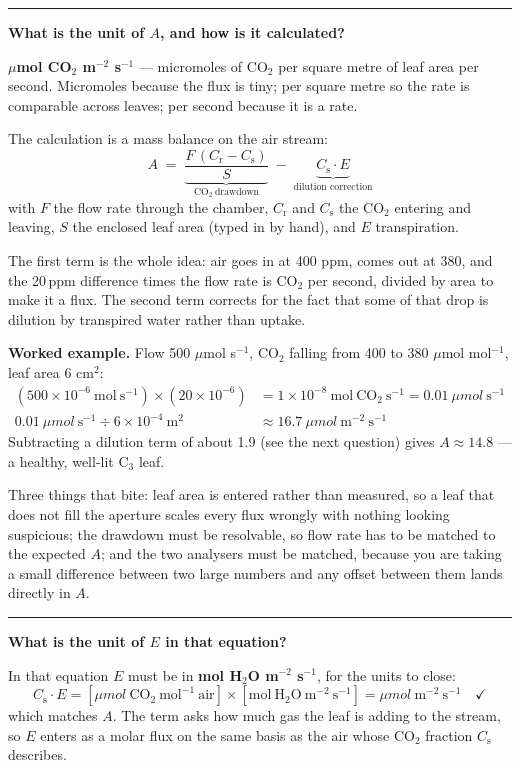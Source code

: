 \documentclass[11pt,letterpaper]{article}
\newcommand{\umol}{\ensuremath{\mu}mol}
\newcommand{\question}[1]{%
  \vspace{1.5em}%
  {\noindent\color{rulegray}\rule{\textwidth}{0.4pt}\par}%
  \vspace{0.7em}%
  {\noindent\color{accent}\bfseries #1\par}%
  \vspace{0.6em}%
}
\begin{document}
\question{What is the unit of $A$, and how is it calculated?}

\textbf{\umol{} CO$_2$ m$^{-2}$ s$^{-1}$} --- micromoles of CO$_2$ per square
metre of leaf area per second. Micromoles because the flux is tiny; per square
metre so the rate is comparable across leaves; per second because it is a rate.

The calculation is a mass balance on the air stream:
\[
A \;=\; \underbrace{\frac{F\,(C_{\mathrm{r}} - C_{\mathrm{s}})}{S}}_{\text{CO}_2\ \text{drawdown}}
   \;-\; \underbrace{C_{\mathrm{s}} \cdot E}_{\text{dilution correction}}
\]
with $F$ the flow rate through the chamber, $C_{\mathrm{r}}$ and
$C_{\mathrm{s}}$ the CO$_2$ entering and leaving, $S$ the enclosed leaf area
(typed in by hand), and $E$ transpiration.

The first term is the whole idea: air goes in at 400 ppm, comes out at 380, and
the 20\,ppm difference times the flow rate is CO$_2$ per second, divided by area
to make it a flux. The second term corrects for the fact that some of that drop
is dilution by transpired water rather than uptake.

\textbf{Worked example.} Flow 500 \umol{} s$^{-1}$, CO$_2$ falling from 400 to
380 \umol{} mol$^{-1}$, leaf area 6 cm$^2$:
\begin{align*}
(500 \times 10^{-6}\ \mathrm{mol\ s^{-1}}) \times (20 \times 10^{-6})
  &= 1 \times 10^{-8}\ \mathrm{mol\ CO_2\ s^{-1}} = 0.01\ \umol\ \mathrm{s^{-1}}\\
0.01\ \umol\ \mathrm{s^{-1}} \div 6 \times 10^{-4}\ \mathrm{m^2}
  &\approx 16.7\ \umol\ \mathrm{m^{-2}\ s^{-1}}
\end{align*}
Subtracting a dilution term of about 1.9 (see the next question) gives $A
\approx 14.8$ --- a healthy, well-lit C$_3$ leaf.

Three things that bite: leaf area is entered rather than measured, so a leaf
that does not fill the aperture scales every flux wrongly with nothing looking
suspicious; the drawdown must be resolvable, so flow rate has to be matched to
the expected $A$; and the two analysers must be matched, because you are taking
a small difference between two large numbers and any offset between them lands
directly in $A$.

\question{What is the unit of $E$ in that equation?}

In that equation $E$ must be in \textbf{mol H$_2$O m$^{-2}$ s$^{-1}$}, for the
units to close:
\[
C_{\mathrm{s}} \cdot E =
[\umol\ \mathrm{CO_2\ mol^{-1}\ air}] \times [\mathrm{mol\ H_2O\ m^{-2}\ s^{-1}}]
= \umol\ \mathrm{m^{-2}\ s^{-1}} \quad\checkmark
\]
which matches $A$. The term asks how much gas the leaf is adding to the stream,
so $E$ enters as a molar flux on the same basis as the air whose CO$_2$ fraction
$C_{\mathrm{s}}$ describes.
\end{document}
